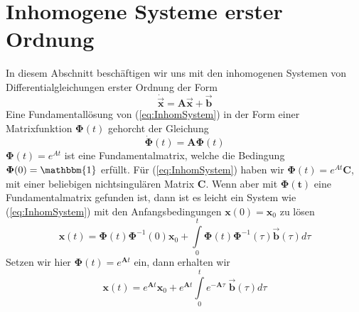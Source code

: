 \section{Inhomogene Systeme erster Ordnung}
In diesem Abschnitt beschäftigen wir uns mit den inhomogenen Systemen von
Differentialgleichungen erster Ordnung der Form
\begin{equation}
  \dot{\vec{\mathbf{x}}}=\mathbf{A}\vec{\mathbf{x}}+\vec{\mathbf{b}}
  \label{eq:InhomSystem}
\end{equation}
Eine Fundamentallösung von (\ref{eq:InhomSystem}) in der Form einer
Matrixfunktion $\boldsymbol{\Phi}(t)$ gehorcht der Gleichung 
\begin{equation}
  \dot{\boldsymbol{\Phi}}(t)=\mathbf{A}\boldsymbol{\Phi}(t)
  \label{eq:Fundamentalmatrix}
\end{equation}
$\boldsymbol{\Phi}(t)=e^{At}$ ist eine Fundamentalmatrix, welche die Bedingung
$\boldsymbol{\Phi}(0)=\mathbbm{1}$ erfüllt. Für (\ref{eq:InhomSystem}) haben wir
$\boldsymbol{\Phi}(t)=e^{At}\mathbf{C}$, mit einer beliebigen nichtsingulären
Matrix $\mathbf{C}$.  Wenn aber mit $\boldsymbol{\Phi(t)}$ eine Fundamentalmatrix
gefunden ist, dann ist es leicht ein System wie (\ref{eq:InhomSystem}) mit den
Anfangsbedingungen $\mathbf{x}(0)=\mathbf{x}_0$ zu lösen
\begin{equation}
  \mathbf{x}(t)=\boldsymbol{\Phi}(t)\boldsymbol{\Phi}^{-1}(0)\mathbf{x}_0
  +\int\limits_0^t\boldsymbol{\Phi}(t)\boldsymbol{\Phi}^{-1}(\tau)\vec{\mathbf{b}}(\tau)d\tau
  \label{eq:LoesInhom}
\end{equation}
Setzen wir hier $\boldsymbol{\Phi}(t)=e^{\mathbf{A}t}$ ein, dann erhalten wir
\[ \mathbf{x}(t)=e^{\mathbf{A}t}\mathbf{x}_0
   +e^{\mathbf{A}t}\int\limits_0^te^{-\mathbf{A}\tau}\;\vec{\mathbf{b}}(\tau)d\tau\]

